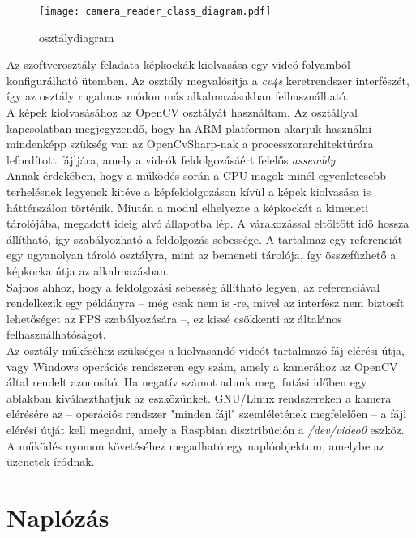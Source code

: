 \begin{wrapfigure}{r}{7cm}
\texttt{[image: camera\_reader\_class\_diagram.pdf]}
\caption{ osztálydiagram}\label{fig:camera_reader_class_diagram}
\end{wrapfigure}
Az szoftverosztály feladata képkockák kiolvasása egy videó folyamból konfigurálható ütemben. Az osztály megvalósítja a \emph{cv4s} keretrendszer  interfészét, így az osztály rugalmas módon más alkalmazásokban felhasználható.\\
A képek kiolvasásához az OpenCV  osztályát használtam. Az osztállyal kapcsolatban megjegyzendő, hogy ha ARM platformon akarjuk használni mindenképp szükség van az OpenCvSharp-nak a processzorarchitektúrára lefordított  fájljára, amely a videók feldolgozásáért felelős \textit{assembly}.\\
Annak érdekében, hogy a működés során a CPU magok minél egyenletesebb terhelésnek legyenek kitéve a képfeldolgozáson kívül a képek kiolvasása is háttérszálon történik. Miután a modul elhelyezte a képkockát a kimeneti tárolójába, megadott ideig alvó állapotba lép. A várakozással eltöltött idő hossza állítható, így szabályozható a feldolgozás sebessége. A  tartalmaz egy referenciát egy ugyanolyan tároló osztályra, mint az  bemeneti tárolója, így összefűzhető a képkocka útja az alkalmazásban.\\
Sajnos ahhoz, hogy a feldolgozási sebesség állítható legyen, az  referenciával rendelkezik egy  példányra -- még csak nem is -re, mivel az interfész nem biztosít lehetőséget az FPS szabályozására --, ez kissé csökkenti az általános felhasználhatóságot.\\
Az osztály műkéséhez szükséges a kiolvasandó videót tartalmazó fáj elérési útja, vagy Windows operációs rendszeren egy szám, amely a kamerához az OpenCV által rendelt azonosító. Ha negatív számot adunk meg, futási időben egy ablakban kiválaszthatjuk az eszközünket. GNU/Linux rendszereken a kamera elérésére az -- operációs rendszer "minden fájl" szemléletének megfelelően -- a fájl elérési útját kell megadni, amely a Raspbian disztribúción a \emph{{/dev/video0}} eszköz. A működés nyomon követéséhez megadható egy naplóobjektum, amelybe az üzenetek íródnak.

\section{Naplózás} \label{subs:logging}

